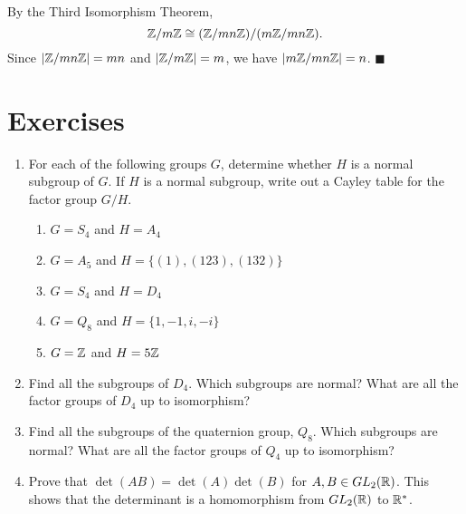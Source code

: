  
\vspace{ 2 ex}
 
 
By the Third Isomorphism Theorem,
$$
{\Bbb Z} / m {\Bbb Z} \cong ({\Bbb Z}/ mn {\Bbb Z})/ (m {\Bbb Z}/ mn
{\Bbb Z}). 
$$
Since $| {\Bbb Z} / mn {\Bbb Z} | = mn$ and  $|{\Bbb Z} / m{\Bbb Z}| =
m$, we have $| m {\Bbb Z} / mn {\Bbb Z}| = n$. 
\hspace{\fill} $\blacksquare$
 
 
\section*{Exercises}
\exrule
 
 
 
{\small
 
 
\begin{enumerate}
 
 
\bf\item\rm
For each of the following groups $G$, determine whether $H$ is a normal
subgroup of $G$. If $H$ is a normal subgroup, write out a Cayley table
for the factor group $G/H$.
\begin{enumerate}
 
 \bf\item\rm
$G = S_4$ and $H = A_4$

 \bf\item\rm
$G = A_5$ and $H = \{ (1), (123), (132) \}$
 
 \bf\item\rm
$G = S_4$ and $H = D_4$
 
 \bf\item\rm
$G = Q_8$ and $H = \{ 1, -1, i, -i \}$
 
 \bf\item\rm
$G = {\Bbb Z}$ and $H = 5 {\Bbb Z}$
 
\end{enumerate}
 
 
\bf\item\rm
Find all the subgroups of $D_4$. Which subgroups are normal? What are
all the factor groups of $D_4$ up to isomorphism?
 
 
\bf\item\rm
Find all the subgroups of the quaternion group, $Q_8$. Which subgroups
are normal? What are all the factor groups of $Q_4$ up to isomorphism? 
 
 
\bf\item\rm
Prove that $\det( AB) = \det(A) \det(B)$ for $A, B \in GL_2( {\Bbb R}
)$. This shows that the determinant is a homomorphism from $GL_2(
{\Bbb R} )$ to ${\Bbb R}^*$. 
 

\end{enumerate}}
